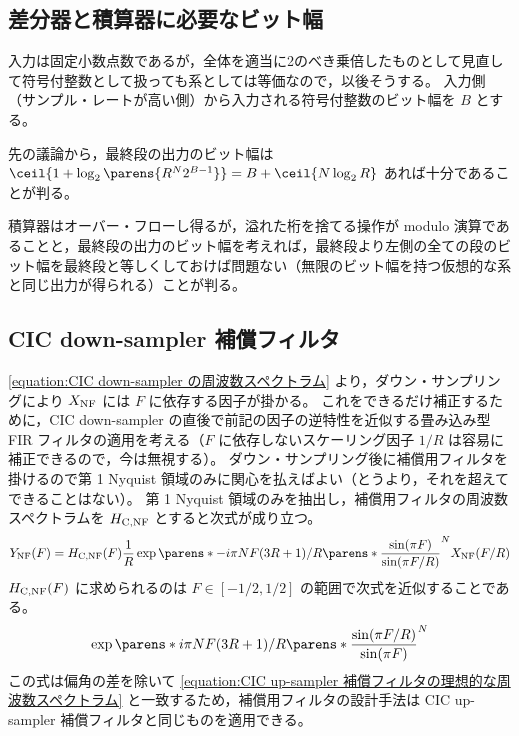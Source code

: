     \subsection{差分器と積算器に必要なビット幅}
        入力は固定小数点数であるが，全体を適当に2のべき乗倍したものとして見直して符号付整数として扱っても系としては等価なので，以後そうする。
        入力側（サンプル・レートが高い側）から入力される符号付整数のビット幅を $B$ とする。
        \par
        先の議論から，最終段の出力のビット幅は $\ceil{1 + \log_2\parens{R^N 2^{B-1}}} = B + \ceil{N\log_2 R}$ あれば十分であることが判る。
        \par
        積算器はオーバー・フローし得るが，溢れた桁を捨てる操作が modulo 演算であることと，最終段の出力のビット幅を考えれば，最終段より左側の全ての段のビット幅を最終段と等しくしておけば問題ない（無限のビット幅を持つ仮想的な系と同じ出力が得られる）ことが判る。
    \subsection{CIC down-sampler 補償フィルタ}
        \cref{equation:CIC down-sampler の周波数スペクトラム} より，ダウン・サンプリングにより $X_\text{NF}$ には $F$ に依存する因子が掛かる。
        これをできるだけ補正するために，CIC down-sampler の直後で前記の因子の逆特性を近似する畳み込み型 FIR フィルタの適用を考える（$F$ に依存しないスケーリング因子 $1/R$ は容易に補正できるので，今は無視する）。
        ダウン・サンプリング後に補償用フィルタを掛けるので第 1 Nyquist 領域のみに関心を払えばよい（とうより，それを超えてできることはない）。
        第 1 Nyquist 領域のみを抽出し，補償用フィルタの周波数スペクトラムを $H_\text{C,NF}$ とすると次式が成り立つ。
        \[ \YNF(F) = \HCNF(F) \frac{1}{R} \exp\parens*{-i\pi N F(3R+1)/R}\parens*{\frac{\sin(\pi F)}{\sin(\pi F/R)}}^N \XNF(F/R) \]
        $H_\text{C,NF}(F)$ に求められるのは $F \in [-1/2,1/2]$ の範囲で次式を近似することである。
        \begin{equation}
            \exp\parens*{i\pi N F(3R+1)/R}\parens*{\frac{\sin(\pi F/R)}{\sin(\pi F)}}^N
        \end{equation}
        この式は偏角の差を除いて \cref{equation:CIC up-sampler 補償フィルタの理想的な周波数スペクトラム} と一致するため，補償用フィルタの設計手法は CIC up-sampler 補償フィルタと同じものを適用できる。
